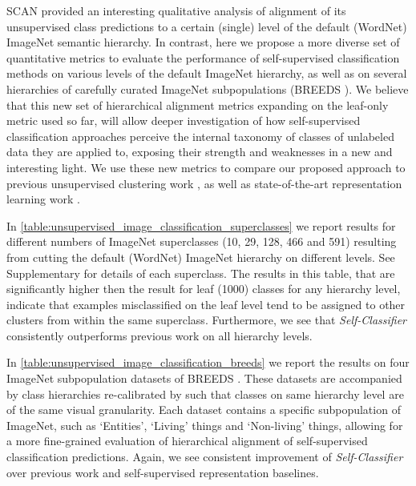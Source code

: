 \documentclass[runningheads]{llncs}
\begin{document}
SCAN provided an interesting qualitative analysis of alignment of its unsupervised class predictions to a certain (single) level of the default (WordNet) ImageNet semantic hierarchy. In contrast, here we propose a more diverse set of quantitative metrics to evaluate the performance of self-supervised classification methods on various levels of the default ImageNet hierarchy, as well as on several hierarchies of carefully curated ImageNet subpopulations (BREEDS \cite{santurkar2020breeds}). We believe that this new set of hierarchical alignment metrics expanding on the leaf-only metric used so far, will allow deeper investigation of how self-supervised classification approaches perceive the internal taxonomy of classes of unlabeled data they are applied to, exposing their strength and weaknesses in a new and interesting light. We use these new metrics to compare our proposed approach to previous unsupervised clustering work \cite{van2020scan,YM.2020Self-labelling}, as well as state-of-the-art representation learning work \cite{chen2020big,chen2021exploring,caron2020unsupervised,chen2020improved,caron2021emerging,gidaris2021obow,tian2020makes,DBLP:conf/icml/ZbontarJMLD21}.

In \cref{table:unsupervised_image_classification_superclasses} we report results for different numbers of ImageNet superclasses (10, 29, 128, 466 and 591) resulting from cutting the default (WordNet) ImageNet hierarchy on different levels. See Supplementary for details of each superclass. The results in this table, that are significantly higher then the result for leaf (1000) classes for any hierarchy level, indicate that examples misclassified on the leaf level tend to be assigned to other clusters from within the same superclass. Furthermore, we see that \textit{Self-Classifier} consistently outperforms previous work on all hierarchy levels.

In \cref{table:unsupervised_image_classification_breeds} we report the results on four ImageNet subpopulation datasets of BREEDS \cite{santurkar2020breeds}. These datasets are accompanied by class hierarchies re-calibrated by \cite{santurkar2020breeds} such that classes on same hierarchy level are of the same visual granularity. Each dataset contains a specific subpopulation of ImageNet, such as `Entities', `Living' things and `Non-living' things, allowing for a more fine-grained evaluation of hierarchical alignment of self-supervised classification predictions. Again, we see consistent improvement of \textit{Self-Classifier} over previous work and self-supervised representation baselines.
\end{document}
